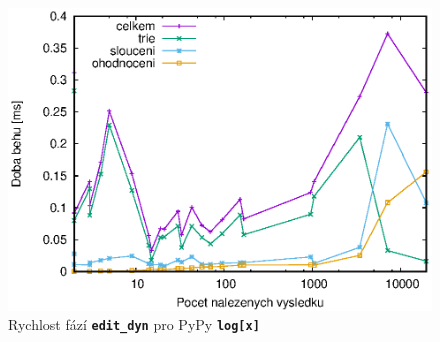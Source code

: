 \documentclass[11pt,letterpaper,oneside,openright]{book}
\newcommand{\bftt}[1]{\texttt{\textbf{#1}}}
\begin{document}
{\begin{minipage}[H]{.5\textwidth}
\begin{figure}[H]
    \includegraphics[width=\textwidth]{figures/timings_pypy_sorted.eps}
    \captionsetup{justification=centering}
    \caption{Rychlost fází \bftt{edit\_dyn} pro PyPy \bftt{log[x]}}
    \label{fig:timings_pypy_sorted}
    \end{figure}
    \end{minipage}}
\end{document}
